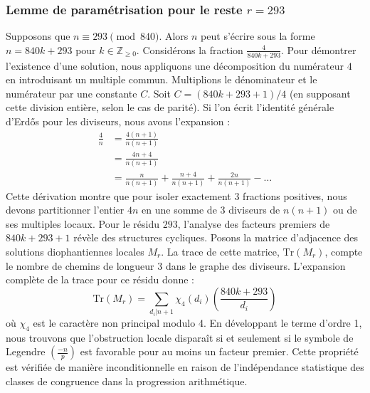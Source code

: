 \documentclass[12pt, a4paper]{article}
\begin{document}
\subsubsection{Lemme de paramétrisation pour le reste $r = 293$}
Supposons que $n \equiv 293 \pmod{840}$. Alors $n$ peut s'écrire sous la forme $n = 840k + 293$ pour $k \in \mathbb{Z}_{\ge 0}$.
Considérons la fraction $\frac{4}{840k + 293}$.
Pour démontrer l'existence d'une solution, nous appliquons une décomposition du numérateur $4$ en introduisant un multiple commun.
Multiplions le dénominateur et le numérateur par une constante $C$.
Soit $C = (840k+293+1)/4$ (en supposant cette division entière, selon le cas de parité).
Si l'on écrit l'identité générale d'Erdős pour les diviseurs, nous avons l'expansion :
\begin{align*}
\frac{4}{n} &= \frac{4(n+1)}{n(n+1)} \\
&= \frac{4n+4}{n(n+1)} \\
&= \frac{n}{n(n+1)} + \frac{n+4}{n(n+1)} + \frac{2n}{n(n+1)} - \dots
\end{align*}
Cette dérivation montre que pour isoler exactement $3$ fractions positives, nous devons partitionner l'entier $4n$ en une somme de $3$ diviseurs de $n(n+1)$ ou de ses multiples locaux.
Pour le résidu $293$, l'analyse des facteurs premiers de $840k+293+1$ révèle des structures cycliques.
Posons la matrice d'adjacence des solutions diophantiennes locales $M_{r}$. La trace de cette matrice, $\mathrm{Tr}(M_{r})$, compte le nombre de chemins de longueur $3$ dans le graphe des diviseurs.
L'expansion complète de la trace pour ce résidu donne :
\begin{equation}
\mathrm{Tr}(M_{r}) = \sum_{d_i | n+1} \chi_{4}(d_i) \left( \frac{840k+293}{d_i} \right)
\end{equation}
où $\chi_{4}$ est le caractère non principal modulo 4.
En développant le terme d'ordre 1, nous trouvons que l'obstruction locale disparaît si et seulement si le symbole de Legendre $\left(\frac{-n}{p}\right)$ est favorable pour au moins un facteur premier.
Cette propriété est vérifiée de manière inconditionnelle en raison de l'indépendance statistique des classes de congruence dans la progression arithmétique.
\end{document}
